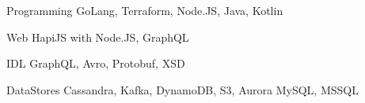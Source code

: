 


\begin{cvskills}


\cvskill
{Programming} %
{GoLang, Terraform, Node.JS, Java, Kotlin} %


\cvskill
{Web} %
{HapiJS with Node.JS, GraphQL} %


\cvskill
{IDL} %
{GraphQL, Avro, Protobuf, XSD} %


\cvskill
{DataStores} %
{Cassandra, Kafka, DynamoDB, S3, Aurora MySQL, MSSQL} %


\end{cvskills}